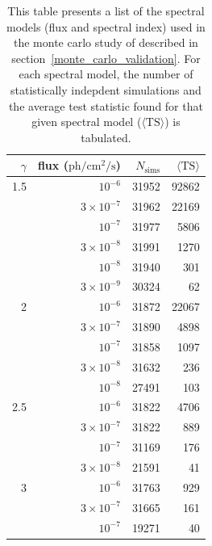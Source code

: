 \documentclass[preprint]{aastex}
\newcommand{\s}{\text{s}\xspace}
\newcommand{\ph}{\text{ph}\xspace}
\newcommand{\cm}{\text{cm}\xspace}
\newcommand{\ts}{\text{TS}\xspace}
\newcommand{\pointlike}{\text{\em pointlike}\xspace}
\begin{document}
\begin{table}
  \begin{centering}
    \begin{tabular}{ r | r | r | r }
      \hline
      \hline
      $\gamma$ & flux ($\ph/\cm^2/\s$) & $N_\text{sims}$ & $\langle\ts\rangle$ \\
      \hline
      1.5 &          $10^{-6}$ &           31952 &  92862 \\
      &  $3\times 10^{-7}$ &           31962 &  22169 \\
      &          $10^{-7}$ &           31977 &   5806 \\
      &  $3\times 10^{-8}$ &           31991 &   1270 \\
      &          $10^{-8}$ &           31940 &    301 \\
      &  $3\times 10^{-9}$ &           30324 &     62 \\
      \hline
      2 &          $10^{-6}$ &           31872 &  22067 \\
      &  $3\times 10^{-7}$ &           31890 &   4898 \\
      &          $10^{-7}$ &           31858 &   1097 \\
      &  $3\times 10^{-8}$ &           31632 &    236 \\
      &          $10^{-8}$ &           27491 &    103 \\
      \hline
      2.5 &          $10^{-6}$ &           31822 &   4706 \\
      &  $3\times 10^{-7}$ &           31822 &    889 \\
      &          $10^{-7}$ &           31169 &    176 \\
      &  $3\times 10^{-8}$ &           21591 &     41 \\
      \hline                                                
      3 &          $10^{-6}$ &           31763 &    929 \\
      &  $3\times 10^{-7}$ &           31665 &    161 \\
      &          $10^{-7}$ &           19271 &     40 \\
      \hline
    \end{tabular}
    \caption{
    This table presents a list of the spectral models (flux and spectral
    index) used in the monte carlo study of \pointlike described in
    section~\ref{monte_carlo_validation}.  For each spectral model, the
    number of statistically indepdent simulations and the average test
    statistic found for that given spectral model ($\langle\ts\rangle$) is tabulated.
}
\end{centering}
\end{table}
\end{document}

